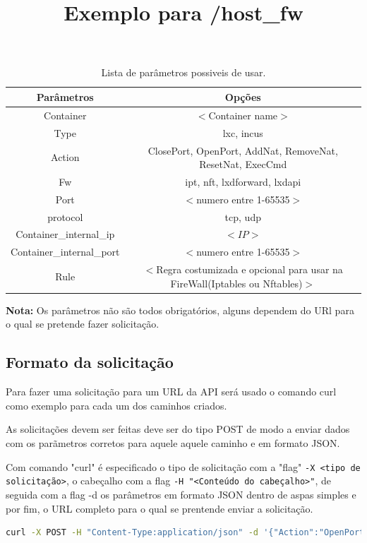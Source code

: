 \begin{table}[H]
\centering
\begin{tabular}{|c|c|}
\hline
\rowcolor{yellow!50}\textbf{Parâmetros} & \textbf{Opções}\\
\hline
Container & $<$Container name$>$\\
\hline
Type & lxc, incus \\
\hline
Action & ClosePort, OpenPort, AddNat, RemoveNat, ResetNat, ExecCmd \\
\hline
Fw & ipt, nft, lxdforward, lxdapi \\
\hline
Port & $<$numero entre 1-65535$>$ \\
\hline
protocol & tcp, udp \\
\hline
Container\_internal\_ip & $<IP>$ \\
\hline
Container\_internal\_port & $<$numero entre 1-65535$>$ \\
\hline
Rule & $<$Regra costumizada e opcional para usar na FireWall(Iptables ou Nftables)$>$ \\
\hline
\end{tabular}
\caption{Lista de parâmetros possiveis de usar.}
\label{arglist}
\end{table}

\textbf{Nota:} Os parâmetros não são todos obrigatórios, alguns dependem do URl para o qual
se pretende fazer solicitação.


\subsection{Formato da solicitação}

Para fazer uma solicitação para um URL da API será usado o comando curl como exemplo para
cada um dos caminhos criados.

As solicitações devem ser feitas deve ser do tipo POST de modo a enviar dados com os parãmetros
corretos para aquele aquele caminho e em formato JSON.

Com comando "curl" é especificado o tipo de solicitação com a "flag" \texttt{-X <tipo de solicitação>},
o cabeçalho com a flag \texttt{-H "<Conteúdo do cabeçalho>"}, de seguida com a flag -d os parâmetros
em formato JSON dentro de aspas simples e por fim, o URL completo para o qual se prentende enviar a
solicitação.



\title*{Exemplo para \slash \textbf{host\_fw}}

\begin{lstlisting}[language=Bash, caption={Exemplo de solicitação para a firewal do sistema host}]
    curl -X POST -H "Content-Type:application/json" -d '{"Action":"OpenPort","Fw":"ipt","Protocol":"tcp","Port":"22"}' http://localhost:5000/host_fw
\end{lstlisting}



